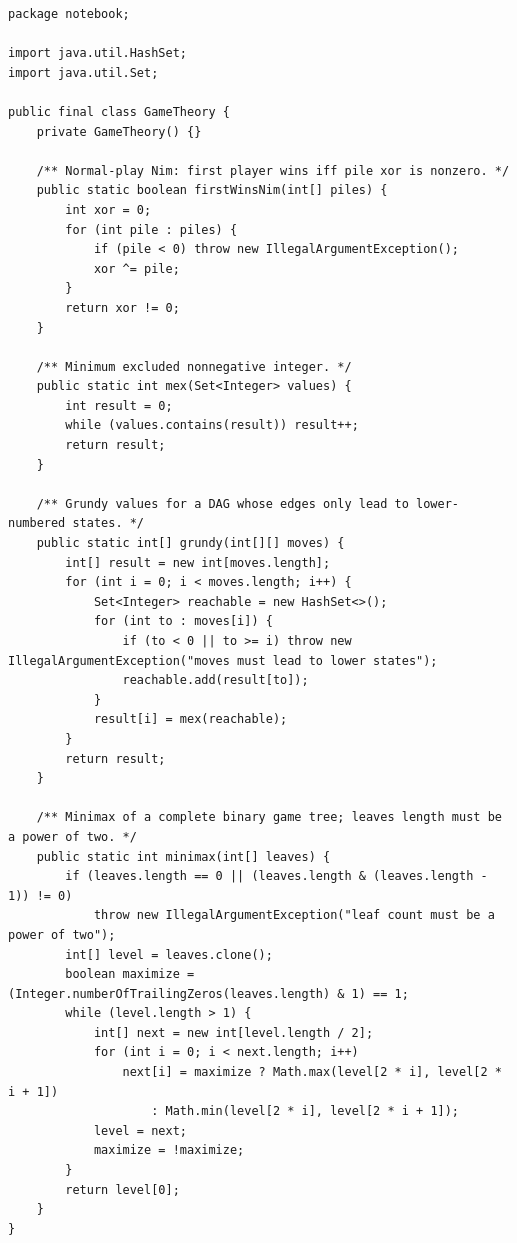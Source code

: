 \documentclass[10pt,letterpaper]{article}
\begin{document}
\begin{lstlisting}
package notebook;

import java.util.HashSet;
import java.util.Set;

public final class GameTheory {
    private GameTheory() {}

    /** Normal-play Nim: first player wins iff pile xor is nonzero. */
    public static boolean firstWinsNim(int[] piles) {
        int xor = 0;
        for (int pile : piles) {
            if (pile < 0) throw new IllegalArgumentException();
            xor ^= pile;
        }
        return xor != 0;
    }

    /** Minimum excluded nonnegative integer. */
    public static int mex(Set<Integer> values) {
        int result = 0;
        while (values.contains(result)) result++;
        return result;
    }

    /** Grundy values for a DAG whose edges only lead to lower-numbered states. */
    public static int[] grundy(int[][] moves) {
        int[] result = new int[moves.length];
        for (int i = 0; i < moves.length; i++) {
            Set<Integer> reachable = new HashSet<>();
            for (int to : moves[i]) {
                if (to < 0 || to >= i) throw new IllegalArgumentException("moves must lead to lower states");
                reachable.add(result[to]);
            }
            result[i] = mex(reachable);
        }
        return result;
    }

    /** Minimax of a complete binary game tree; leaves length must be a power of two. */
    public static int minimax(int[] leaves) {
        if (leaves.length == 0 || (leaves.length & (leaves.length - 1)) != 0)
            throw new IllegalArgumentException("leaf count must be a power of two");
        int[] level = leaves.clone();
        boolean maximize = (Integer.numberOfTrailingZeros(leaves.length) & 1) == 1;
        while (level.length > 1) {
            int[] next = new int[level.length / 2];
            for (int i = 0; i < next.length; i++)
                next[i] = maximize ? Math.max(level[2 * i], level[2 * i + 1])
                    : Math.min(level[2 * i], level[2 * i + 1]);
            level = next;
            maximize = !maximize;
        }
        return level[0];
    }
}
\end{lstlisting}
\end{document}
